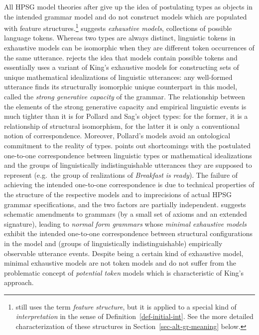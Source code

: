 \documentclass[output=paper
 	        ,biblatex
                ,babelshorthands
                ,newtxmath
                ,draftmode
                ,colorlinks, citecolor=brown
]{langscibook}
\begin{document}
{All HPSG model theories after \cite{PollardSag1994} give up the idea of
postulating types as objects in the intended
grammar model and do not construct models which are populated with feature
structures.\footnote{\cite[294]{Pollard99a} still uses the term \emph{feature
    structure}, but it is applied to a special kind of \emph{interpretation}
  in the sense of Definition~\ref{def-initial-int}. See the
  more detailed characterization of these structures in
  Section~\ref{sec-alt-gr-meaning} below.} \citet{King99a-u} suggests \emph{exhaustive models},
collections of possible language tokens. Whereas two types are always
distinct, linguistic tokens in
exhaustive models can be isomorphic when they are different token
occurrences of the same utterance. \citet{Pollard99a} rejects the idea
that models contain possible tokens and essentially uses a variant of
King's exhaustive models for constructing sets of unique mathematical
idealizations of linguistic utterances: any well-formed utterance
finds its structurally isomorphic unique counterpart in this model,
called the \emph{strong generative capacity} of the grammar. The
relationship between the elements of the strong generative capacity
and empirical linguistic events is much tighter than it is for
Pollard and Sag's object types: for the former, it is a relationship
of structural isomorphism, for the latter it is only a conventional
notion of correspondence. Moreover, Pollard's models avoid an
ontological commitment to the reality of types. \citet{Richter2007a}
points out shortcomings with the postulated one-to-one correspondence
between linguistic types \citep{PollardSag1994} or mathematical
idealizations \citep{Pollard99a} and the groups of
linguistically indistinguishable utterances they
are supposed to represent (e.g.\ the group of realizations of
\emph{Breakfast is ready}). The failure of achieving the intended
one-to-one correspondence
is due to technical properties of the structure of the respective models
and to imprecisions of actual HPSG grammar
specifications, and the two factors are partially
independent. \citet{Richter2007a} suggests schematic amendments to
grammars (by a small set of axioms and an extended signature),
leading to \emph{normal form grammars} whose \emph{minimal exhaustive
  models} exhibit the intended one-to-one correspondence
between structural configurations in the model and (groups of linguistically
indistinguishable) empirically
observable utterance events. Despite being a certain kind of
exhaustive model, minimal exhaustive models are not token models and
do not suffer from the problematic concept of \emph{potential token} models
which is characteristic of King's approach.

}
\end{document}
